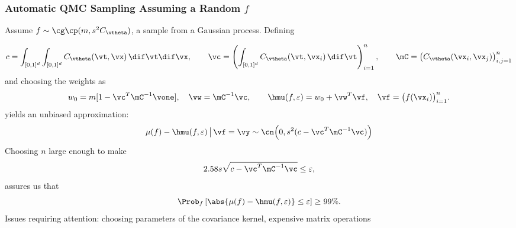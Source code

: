 \documentclass[10pt,compress,xcolor={usenames,dvipsnames},aspectratio=169]{beamer} %
\DeclareMathOperator{\GP}{\cg\cp}
\begin{document}
\begin{frame}
\frametitle{Automatic QMC Sampling Assuming a Random $f$}
\vspace{-3ex}
\alert{Assume } $f \sim \GP(m,s^2C_{\vtheta})$, a sample from a Gaussian process.  Defining

\vspace{-5ex}
\begin{equation*}
c = \int_{[0,1]^d} \int_{[0,1]^d} C_{\vtheta}(\vt,\vx) \, \dif \vt \dif \vx, \qquad 
\vc = \left(\int_{[0,1]^d}  C_{\vtheta}(\vt,\vx_i) \, \dif \vt  \right)_{i=1}^n , \qquad
\mC = \bigl(C_{\vtheta}(\vx_i,\vx_j)  \bigr)_{i,j=1}^n
\end{equation*}
and choosing the \alert{weights} as
\begin{equation*}
w_0 = m[ 1 - \vc^T \mC^{-1}\vone], \quad \vw = \mC^{-1} \vc, \qquad \hmu(f, \varepsilon)  = w_0 + \vw^T\vf,
\quad \vf = \bigl ( f(\vx_i) \bigr)_{i=1}^n.
\end{equation*}
yields an unbiased approximation:
\begin{equation*}
\mu(f) - \hmu(f,\varepsilon) \, \big \vert \, \vf = \vy \sim \cn\Bigl( 0, s^2(c - \vc^T \mC^{-1}\vc)\Bigr)
\end{equation*}
Choosing $n$  large enough to make 
\begin{equation*}
2.58s\sqrt{c - \vc^T \mC^{-1}\vc} \le \varepsilon,
\end{equation*}
 \alert{assures} us that 
\begin{equation*}
\Prob_{f} \left[\abs{ \mu(f) - \hmu(f,\varepsilon) } \le \varepsilon \right] \ge 99\%.
\end{equation*}
	\alert{Issues requiring attention:}  choosing parameters of the covariance kernel, expensive matrix operations
\end{frame}
\end{document}
